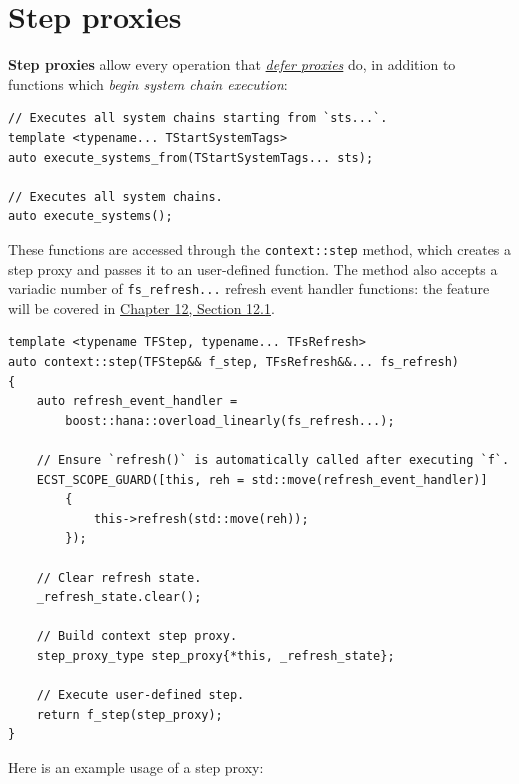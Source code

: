 \documentclass[oneside, 12pt, a4paper, openany]{book}
\begin{document}
\hypertarget{proxies_step}{\section{Step proxies}\label{proxies_step}}

\textbf{Step proxies} allow every operation that
\protect\hyperlink{proxies_defer}{\emph{defer proxies}} do, in addition
to functions which \emph{begin system chain execution}:

\begin{verbatim}
// Executes all system chains starting from `sts...`.
template <typename... TStartSystemTags>
auto execute_systems_from(TStartSystemTags... sts);

// Executes all system chains.
auto execute_systems();
\end{verbatim}

These functions are accessed through the
\texttt{context::step}
method, which creates a step proxy and passes it to an user-defined
function. The method also accepts a variadic number of
\texttt{fs_refresh...}
refresh event handler functions: the feature will be covered in
\protect\hyperlink{chap_advfeats}{Chapter 12, Section 12.1}.

\begin{verbatim}
template <typename TFStep, typename... TFsRefresh>
auto context::step(TFStep&& f_step, TFsRefresh&&... fs_refresh)
{
    auto refresh_event_handler =
        boost::hana::overload_linearly(fs_refresh...);

    // Ensure `refresh()` is automatically called after executing `f`.
    ECST_SCOPE_GUARD([this, reh = std::move(refresh_event_handler)]
        {
            this->refresh(std::move(reh));
        });

    // Clear refresh state.
    _refresh_state.clear();

    // Build context step proxy.
    step_proxy_type step_proxy{*this, _refresh_state};

    // Execute user-defined step.
    return f_step(step_proxy);
}
\end{verbatim}

Here is an example usage of a step proxy:
\end{document}
